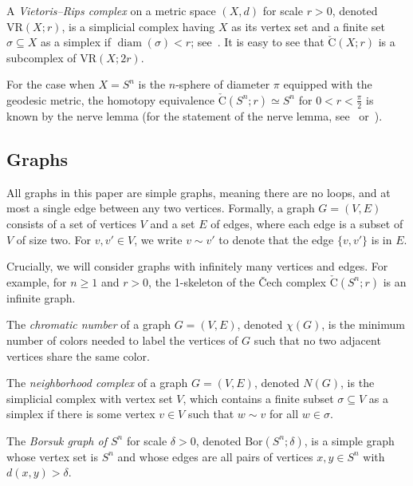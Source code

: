 \documentclass[11 pt,a4paper,twoside,reqno]{amsart}
\theoremstyle{definition}
\newcommand{\vr}[2]{\mathrm{VR}(#1;#2)}
\newcommand{\cech}[2]{\mathrm{\check{C}}(#1;#2)}
\DeclareMathOperator{\diam}{diam}
\newcommand{\bor}[2]{\mathrm{Bor}(#1;#2)}
\begin{document}
A \emph{Vietoris--Rips complex} on a metric space $(X,d)$ for scale $r > 0$, denoted $\vr{X}{r}$, is a simplicial complex having $X$ as its vertex set and a finite set $\sigma \subseteq X$ as a simplex if $\diam(\sigma) < r$; see~\cite{Vietoris27,EdelsbrunnerHarer}.
It is easy to see that $\cech{X}{r}$ is a subcomplex of $\vr{X}{2r}$.

For the case when $X = S^n$ is the $n$-sphere of diameter $\pi$ equipped with the geodesic metric, the homotopy equivalence $\cech{S^n}{r} \simeq S^n$ for $0 < r < \frac{\pi}{2}$ is known by the nerve lemma (for the statement of the nerve lemma, see~\cite[Appendix]{farber2023large} or~\cite[Corollary~4G.3]{Hatcher}).



\subsection{Graphs}
\label{sec:graphs}
All graphs in this paper are simple graphs, meaning there are no loops, and at most a single edge between any two vertices.
Formally, a graph $G=(V,E)$ consists of a set of vertices $V$ and a set $E$ of edges, where each edge is a subset of $V$ of size two.
For $v,v'\in V$, we write $v\sim v'$ to denote that the edge $\{v,v'\}$ is in $E$.

Crucially, we will consider graphs with infinitely many vertices and edges.
For example, for $n\ge 1$ and $r>0$, the 1-skeleton of the \v{C}ech complex $\cech{S^n}{r}$ is an infinite graph.

The \emph{chromatic number} of a graph $G=(V,E)$, denoted $\chi(G)$, is the minimum number of colors needed to label the vertices of $G$ such that no two adjacent vertices share the same color.

The \emph{neighborhood complex} of a graph $G=(V,E)$, denoted $N(G)$, is the simplicial complex with vertex set $V$, which contains a finite subset $\sigma\subseteq V$ as a simplex if there is some vertex $v\in V$ such that $w\sim v$ for all $w\in \sigma$.

The \emph{Borsuk graph of $S^n$} for scale $\delta>0$, denoted $\bor{S^n}{\delta}$, is a simple graph whose vertex set is $S^n$ and whose edges are all pairs of vertices $x,y\in S^n$ with $d(x,y)> \delta$.
\end{document}
